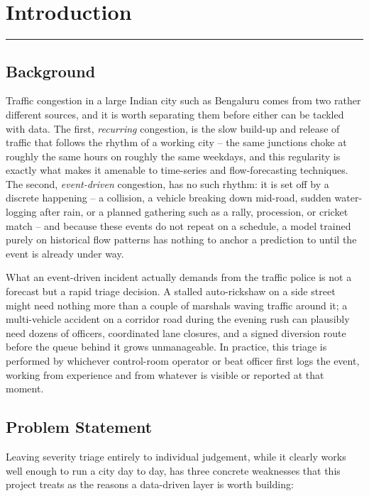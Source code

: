 \chapter{Introduction}
\label{chap:introduction}
\noindent \rule{6.6in}{0.01in}
\newpage

\section{Background}

Traffic congestion in a large Indian city such as Bengaluru comes from two rather different sources, and it is worth separating them before either can be tackled with data. The first, \emph{recurring} congestion, is the slow build-up and release of traffic that follows the rhythm of a working city -- the same junctions choke at roughly the same hours on roughly the same weekdays, and this regularity is exactly what makes it amenable to time-series and flow-forecasting techniques. The second, \emph{event-driven} congestion, has no such rhythm: it is set off by a discrete happening -- a collision, a vehicle breaking down mid-road, sudden water-logging after rain, or a planned gathering such as a rally, procession, or cricket match -- and because these events do not repeat on a schedule, a model trained purely on historical flow patterns has nothing to anchor a prediction to until the event is already under way.

What an event-driven incident actually demands from the traffic police is not a forecast but a rapid triage decision. A stalled auto-rickshaw on a side street might need nothing more than a couple of marshals waving traffic around it; a multi-vehicle accident on a corridor road during the evening rush can plausibly need dozens of officers, coordinated lane closures, and a signed diversion route before the queue behind it grows unmanageable. In practice, this triage is performed by whichever control-room operator or beat officer first logs the event, working from experience and from whatever is visible or reported at that moment.

\section{Problem Statement}

Leaving severity triage entirely to individual judgement, while it clearly works well enough to run a city day to day, has three concrete weaknesses that this project treats as the reasons a data-driven layer is worth building:

